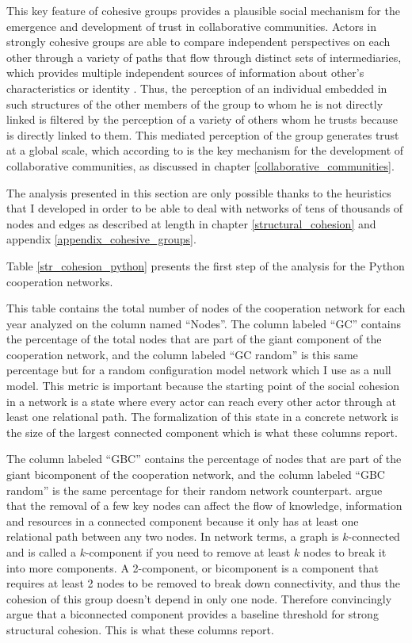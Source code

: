 This key feature of cohesive groups provides a plausible social mechanism for the emergence and development of trust in collaborative communities. Actors in strongly cohesive groups are able to compare independent perspectives on each other through a variety of paths that flow through distinct sets of intermediaries, which provides multiple independent sources of information about other's characteristics or identity \citep[320]{white:2001}. Thus, the perception of an individual embedded in such structures of the other members of the group to whom he is not directly linked is filtered by the perception of a variety of others whom he trusts because is directly linked to them. This mediated perception of the group generates trust at a global scale, which according to \citet{adler:2006} is the key mechanism for the development of collaborative communities, as discussed in chapter \ref{collaborative_communities}.

The analysis presented in this section are only possible thanks to the heuristics that I developed in order to be able to deal with networks of tens of thousands of nodes and edges as described at length in chapter \ref{structural_cohesion} and appendix \ref{appendix_cohesive_groups}. 

Table \ref{str_cohesion_python} presents the first step of the analysis for the Python cooperation networks.



This table contains the total number of nodes of the cooperation network for each year analyzed on the column named ``Nodes''. The column labeled ``GC'' contains the percentage of the total nodes that are part of the giant component of the cooperation network, and the column labeled ``GC random'' is this same percentage but for a random configuration model network which I use as a null model. This metric is important because the starting point of the social cohesion in a network is a state where every actor can reach every other actor through at least one relational path. The formalization of this state in a concrete network is the size of the largest connected component which is what these columns report. 

The column labeled ``GBC'' contains the percentage of nodes that are part of the giant bicomponent of the cooperation network, and the column labeled ``GBC random'' is the same percentage for their random network counterpart. \citet{moody:2003} argue that the removal of a few key nodes can affect the flow of knowledge, information and resources in a connected component because it only has at least one relational path between any two nodes. In network terms, a graph is $k$-connected and is called a $k$-component if you need to remove at least $k$ nodes to break it into more components. A 2-component, or bicomponent is a component that requires at least 2 nodes to be removed to break down connectivity, and thus the cohesion of this group doesn't depend in only one node. Therefore \citet{moody:2003} convincingly argue that a biconnected component provides a baseline threshold for strong structural cohesion. This is what these columns report.

